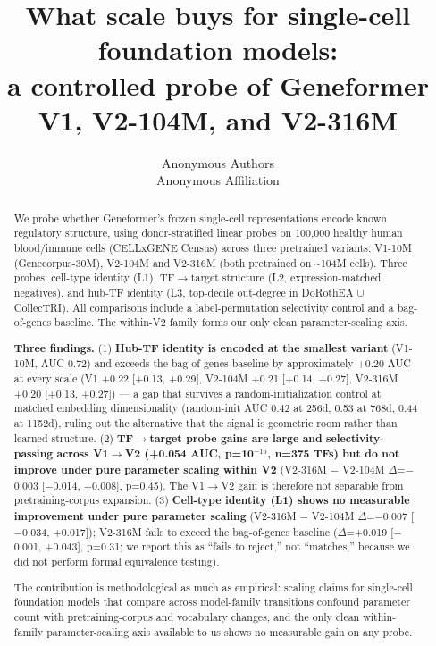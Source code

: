 \documentclass[10pt]{article}
\title{What scale buys for single-cell foundation models:\\
a controlled probe of Geneformer V1, V2-104M, and V2-316M}
\author{\name Anonymous Authors \email \\
        \addr Anonymous Affiliation}
\begin{document}
\maketitle
\begin{abstract}
\noindent We probe whether Geneformer's frozen single-cell representations encode
known regulatory structure, using donor-stratified linear probes on
100,000 healthy human blood/immune cells (CELLxGENE Census) across three
pretrained variants: V1-10M (Genecorpus-30M), V2-104M and V2-316M (both
pretrained on \textasciitilde104M cells). Three probes: cell-type
identity (L1), TF$\to$target structure (L2, expression-matched negatives),
and hub-TF identity (L3, top-decile out-degree in DoRothEA $\cup$ CollecTRI).
All comparisons include a label-permutation selectivity control \citep{hewitt2019} and a bag-of-genes baseline. The within-V2 family forms
our only clean parameter-scaling axis.

\textbf{Three findings.} (1) \textbf{Hub-TF identity is encoded at the
smallest variant} (V1-10M, AUC 0.72) and exceeds the bag-of-genes
baseline by approximately +0.20 AUC at every scale (V1 +0.22 {[}+0.13, +0.29{]}, V2-104M +0.21 {[}+0.14, +0.27{]}, V2-316M +0.20 {[}+0.13, +0.27{]}) --- a gap that survives a random-initialization control at
matched embedding dimensionality (random-init AUC 0.42 at 256d, 0.53 at 768d, 0.44 at 1152d), ruling out the alternative that the signal is
geometric room rather than learned structure. (2) \textbf{TF$\to$target
probe gains are large and selectivity-passing across V1$\to$V2 (+0.054 AUC,
p=10$^{-16}$, n=375 TFs) but do not improve under pure parameter scaling
within V2} (V2-316M $-$ V2-104M $\Delta$=$-$0.003 {[}$-$0.014, +0.008{]}, p=0.45).
The V1$\to$V2 gain is therefore not separable from pretraining-corpus
expansion. (3) \textbf{Cell-type identity (L1) shows no measurable
improvement under pure parameter scaling} (V2-316M $-$ V2-104M $\Delta$=$-$0.007
{[}$-$0.034, +0.017{]}); V2-316M fails to exceed the bag-of-genes baseline
($\Delta$=+0.019 {[}$-$0.001, +0.043{]}, p=0.31; we report this as ``fails to
reject,'' not ``matches,'' because we did not perform formal equivalence
testing).

The contribution is methodological as much as empirical: scaling claims
for single-cell foundation models that compare across model-family
transitions confound parameter count with pretraining-corpus and
vocabulary changes, and the only clean within-family parameter-scaling
axis available to us shows no measurable gain on any probe.

\end{abstract}
\end{document}

